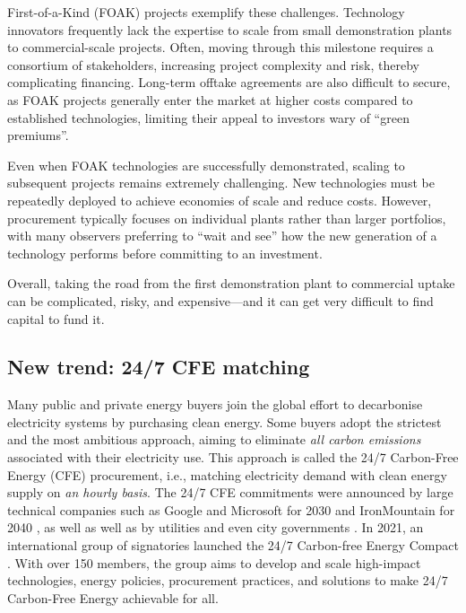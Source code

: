 \documentclass[pdflatex,sn-basic, Numbered]{sn-jnl}%
\theoremstyle{thmstyleone}%
\theoremstyle{thmstyletwo}%
\theoremstyle{thmstylethree}%
\begin{document}
First-of-a-Kind (FOAK) projects exemplify these challenges. Technology innovators frequently lack the expertise to scale from small demonstration plants to commercial-scale projects. Often, moving through this milestone requires a consortium of stakeholders, increasing project complexity and risk, thereby complicating financing. Long-term offtake agreements are also difficult to secure, as FOAK projects generally enter the market at higher costs compared to established technologies, limiting their appeal to investors wary of \enquote{green premiums}.

Even when FOAK technologies are successfully demonstrated, scaling to subsequent projects remains extremely challenging. New technologies must be repeatedly deployed to achieve economies of scale and reduce costs. However, procurement typically focuses on individual plants rather than larger portfolios, with many observers preferring to \enquote{wait and see} how the new generation of a technology performs before committing to an investment.

Overall, taking the road from the first demonstration plant to commercial uptake can be complicated, risky, and expensive---and it can get very difficult to find capital to fund it.


\subsection*{New trend: 24/7 CFE matching}\label{sec3}

Many public and private energy buyers join the global effort to decarbonise electricity systems by purchasing clean energy.
Some buyers adopt the strictest and the most ambitious approach, aiming to eliminate \textit{all carbon emissions} associated with their electricity use.
This approach is called the 24/7 Carbon-Free Energy (CFE) procurement, i.e., matching electricity demand with clean energy supply on \textit{an hourly basis}.
The 24/7 CFE commitments were announced by large technical companies such as Google and Microsoft for 2030 and IronMountain for 2040 \cite{google-247by2030, Microsoft-vision, IronMountainSustainability}, as well as well as by utilities \cite{peninsula-OurPathto247} and even city governments \cite{iowaenvcouncil-247}.
In 2021, an international group of signatories launched the 24/7 Carbon-free Energy Compact \cite{gocarbonfree247}. With over 150 members, the group aims to develop and scale high-impact technologies, energy policies, procurement practices, and solutions to make 24/7 Carbon-Free Energy achievable for all.
\end{document}
